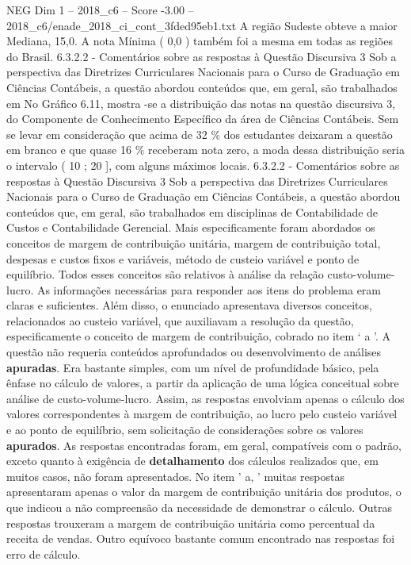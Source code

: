 \begin{textsample}{NEG Dim 1 – 2018\_c6 – Score -3.00 – 2018\_c6/enade\_2018\_ci\_cont\_3fded95eb1.txt}
A região Sudeste obteve a maior Mediana, 15,0.
A nota Mínima ( 0,0 ) também foi a mesma em todas as regiões do Brasil. 6.3.2.2 - Comentários sobre as respostas à Questão Discursiva 3 Sob a perspectiva das Diretrizes Curriculares Nacionais para o Curso de Graduação em Ciências Contábeis, a questão abordou conteúdos que, em geral, são trabalhados em No Gráfico 6.11, mostra -se a distribuição das notas na questão discursiva 3, do Componente de Conhecimento Específico da área de Ciências Contábeis.
Sem se levar em consideração que acima de 32 \% dos estudantes deixaram a questão em branco e que quase 16 \% receberam nota zero, a moda dessa distribuição seria o intervalo ( 10 ; 20 ], com alguns máximos locais. 6.3.2.2 - Comentários sobre as respostas à Questão Discursiva 3 Sob a perspectiva das Diretrizes Curriculares Nacionais para o Curso de Graduação em Ciências Contábeis, a questão abordou conteúdos que, em geral, são trabalhados em disciplinas de Contabilidade de Custos e Contabilidade Gerencial.
Mais especificamente foram abordados os conceitos de margem de contribuição unitária, margem de contribuição total, despesas e custos fixos e variáveis, método de custeio variável e ponto de equilíbrio.
Todos esses conceitos são relativos à análise da relação custo-volume-lucro.
As informações necessárias para responder aos itens do problema eram claras e suficientes.
Além disso, o enunciado apresentava diversos conceitos, relacionados ao custeio variável, que auxiliavam a resolução da questão, especificamente o conceito de margem de contribuição, cobrado no item ‘ a ’.
A questão não requeria conteúdos aprofundados ou desenvolvimento de análises \textbf{apuradas}.
Era bastante simples, com um nível de profundidade básico, pela ênfase no cálculo de valores, a partir da aplicação de uma lógica conceitual sobre análise de custo-volume-lucro.
Assim, as respostas envolviam apenas o cálculo dos valores correspondentes à margem de contribuição, ao lucro pelo custeio variável e ao ponto de equilíbrio, sem solicitação de considerações sobre os valores \textbf{apurados}.
As respostas encontradas foram, em geral, compatíveis com o padrão, exceto quanto à exigência de \textbf{detalhamento} dos cálculos realizados que, em muitos casos, não foram apresentados.
No item ' a, ' muitas respostas apresentaram apenas o valor da margem de contribuição unitária dos produtos, o que indicou a não compreensão da necessidade de demonstrar o cálculo.
Outras respostas trouxeram a margem de contribuição unitária como percentual da receita de vendas.
Outro equívoco bastante comum encontrado nas respostas foi erro de cálculo.

\end{textsample}
